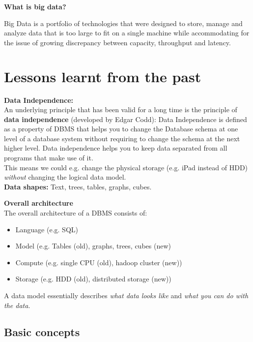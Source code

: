 \documentclass[11pt,oneside,a4paper]{article}
\begin{document}
\textbf{What is big data?}

Big Data is a portfolio of technologies that were designed to store, manage and analyze data that is too large to fit on a single machine while accommodating for the issue of growing discrepancy between
capacity, throughput and latency.

\section{Lessons learnt from the past}

\textbf{Data Independence:}\\
An underlying principle that has been valid for a long time is the principle of \textbf{data independence} (developed by Edgar Codd): Data Independence is defined as a property of DBMS that helps you to change the Database schema at one level of a database system without requiring to change the schema at the next higher level. Data independence helps you to keep data separated from all programs that make use of it.\\
This means we could e.g. change the physical storage (e.g. iPad instead of HDD) \textit{without} changing the logical data model.\\

\textbf{Data shapes:} Text, trees, tables, graphs, cubes.

\textbf{Overall architecture}\\
The overall architecture of a DBMS consists of:

\vspace{-\topsep}
\begin{itemize}
	\setlength{\itemsep}{0pt}
	\setlength{\parskip}{0pt}
	\item Language (e.g. SQL)
	\item Model (e.g. Tables (old), graphs, trees, cubes (new)
	\item Compute (e.g. single CPU (old), hadoop cluster (new))
	\item Storage (e.g. HDD (old), distributed storage (new))
\end{itemize}
\vspace{-\topsep}

A data model essentially describes \textit{what data looks like} and \textit{what you can do with the data}.

\subsection{Basic concepts}
\end{document}
